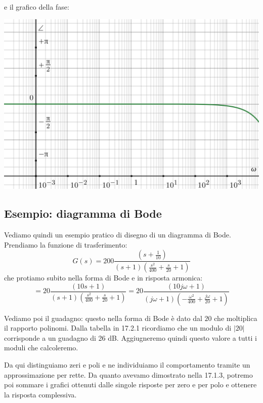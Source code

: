 \documentclass[a4paper,11pt]{article}
\begin{document}
\noindent
\begin{minipage}{\textwidth}
e il grafico della fase:

\begin{center}
	\includegraphics[scale=0.3]{../figures/delay_bode/phase.png}
\end{center}
\end{minipage}

\par\bigskip

\subsection{Esempio: diagramma di Bode}
Vediamo quindi un esempio pratico di disegno di un diagramma di Bode.
Prendiamo la funzione di trasferimento:
$$
G(s) = 200 \frac{\left( s+ \frac{1}{10} \right)}{ (s + 1) \left( \frac{s^2}{400} + \frac{s}{20} + 1 \right) }
$$
che protiamo subito nella forma di Bode e in risposta armonica:
$$
= 20 \frac{\left( 10s + 1 \right)}{ (s + 1) \left( \frac{s^2}{400} + \frac{s}{20} + 1 \right) } 
= 20 \frac{\left( 10 j \omega + 1 \right)}{ (j \omega + 1) \left( -\frac{\omega^2}{400} + \frac{j \omega}{20} + 1 \right) }
$$

Vediamo poi il guadagno: questo nella forma di Bode è dato dal $20$ che moltiplica il rapporto polinomi.
Dalla tabella in 17.2.1 ricordiamo che un modulo di $|20|$ corrisponde a un guadagno di 26 dB.
Aggiugneremo quindi questo valore a tutti i moduli che calcoleremo.

Da qui distinguiamo zeri e poli e ne individuiamo il comportamento tramite un approssimazione per rette.
Da quanto avevamo dimostrato nella 17.1.3, potremo poi sommare i grafici ottenuti dalle singole risposte per zero e per polo e ottenere la risposta complessiva.
\end{document}
